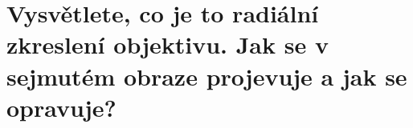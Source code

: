 \section{Vysvětlete, co je to radiální zkreslení objektivu. Jak se v sejmutém obraze projevuje a jak se opravuje?}